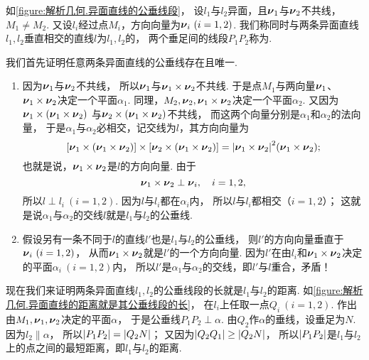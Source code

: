 如\cref{figure:解析几何.异面直线的公垂线段}，
设\(l_1\)与\(l_2\)异面，且\(\boldsymbol{\nu}_1\)与\(\boldsymbol{\nu}_2\)不共线，\(M_1 \neq M_2\).
又设\(l_i\)经过点\(M_i\)，方向向量为\(\boldsymbol{\nu}_i\ (i=1,2)\).
我们称同时与两条异面直线\(l_1,l_2\)垂直相交的直线\(l\)为\(l_1,l_2\)的，
两个垂足间的线段\(P_1 P_2\)称为.

我们首先证明任意两条异面直线的公垂线存在且唯一.
\begin{enumerate}
	\item 因为\(\boldsymbol{\nu}_1\)与\(\boldsymbol{\nu}_2\)不共线，
	所以\(\boldsymbol{\nu}_1\)与\(\boldsymbol{\nu}_1\times\boldsymbol{\nu}_2\)不共线.
	于是点\(M_1\)与两向量\(\boldsymbol{\nu}_1\)、\(\boldsymbol{\nu}_1\times\boldsymbol{\nu}_2\)决定一个平面\(\alpha_1\).
	同理，\(M_2,\boldsymbol{\nu}_2,\boldsymbol{\nu}_1\times\boldsymbol{\nu}_2\)决定一个平面\(\alpha_2\).
	又因为\(\boldsymbol{\nu}_1\times(\boldsymbol{\nu}_1\times\boldsymbol{\nu}_2)\)
	与\(\boldsymbol{\nu}_2\times(\boldsymbol{\nu}_1\times\boldsymbol{\nu}_2)\)不共线，
	而这两个向量分别是\(\alpha_1\)和\(\alpha_2\)的法向量，
	于是\(\alpha_1\)与\(\alpha_2\)必相交，记交线为\(l\)，其方向向量为\[
		[\boldsymbol{\nu}_1\times(\boldsymbol{\nu}_1\times\boldsymbol{\nu}_2)]
		\times[\boldsymbol{\nu}_2\times(\boldsymbol{\nu}_1\times\boldsymbol{\nu}_2)]
		= \abs{\boldsymbol{\nu}_1\times\boldsymbol{\nu}_2}^2(\boldsymbol{\nu}_1\times\boldsymbol{\nu}_2);
	\]
	也就是说，\(\boldsymbol{\nu}_1\times\boldsymbol{\nu}_2\)是\(l\)的方向向量.
	由于\[
		\boldsymbol{\nu}_1\times\boldsymbol{\nu}_2 \perp \boldsymbol{\nu}_i,
		\quad i=1,2,
	\]
	所以\(l \perp l_i\ (i=1,2)\).
	因为\(l\)与\(l_i\)都在\(\alpha_i\)内，
	所以\(l\)与\(l_i\)都相交（\(i=1,2\)）；
	这就是说\(\alpha_1\)与\(\alpha_2\)的交线\(l\)就是\(l_1\)与\(l_2\)的公垂线.

	\item 假设另有一条不同于\(l\)的直线\(l'\)也是\(l_1\)与\(l_2\)的公垂线，
	则\(l'\)的方向向量垂直于\(\boldsymbol{\nu}_i\ (i=1,2)\)，
	从而\(\boldsymbol{\nu}_1\times\boldsymbol{\nu}_2\)就是\(l'\)的一个方向向量.
	因为\(l'\)在由\(l_i\)和\(\boldsymbol{\nu}_1\times\boldsymbol{\nu}_2\)决定的平面\(\alpha_i\ (i=1,2)\)内，
	所以\(l'\)是\(\alpha_1\)与\(\alpha_2\)的交线，即\(l'\)与\(l\)重合，矛盾！
\end{enumerate}

现在我们来证明两条异面直线\(l_1,l_2\)的公垂线段的长就是\(l_1\)与\(l_2\)的距离.
如\cref{figure:解析几何.异面直线的距离就是其公垂线段的长}，
在\(l_i\)上任取一点\(Q_i\ (i=1,2)\).
作出由\(M_1,\boldsymbol{\nu}_1,\boldsymbol{\nu}_2\)决定的平面\(\alpha\)，
于是公垂线\(P_1 P_2 \perp \alpha\).
由\(Q_2\)作\(\alpha\)的垂线，设垂足为\(N\).
因为\(l_2 \parallel \alpha\)，
所以\(\abs{P_1 P_2} = \abs{Q_2 N}\)；
又因为\(\abs{Q_2 Q_1} \geq \abs{Q_2 N}\)，
所以\(\abs{P_1 P_2}\)是\(l_1\)与\(l_2\)上的点之间的最短距离，即\(l_1\)与\(l_2\)的距离.

